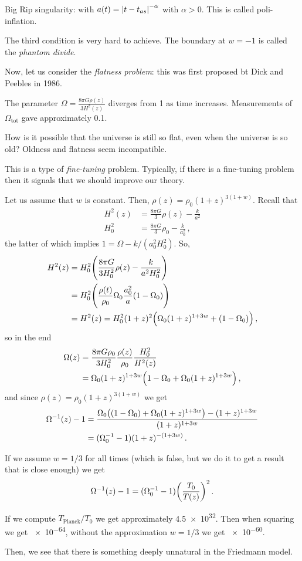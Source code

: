 \documentclass[main.tex]{subfiles}
\begin{document}
Big Rip singularity: with \(a(t) = \abs{t - t_{as}}^{- \alpha } \) with \(\alpha >0\). This is called poli-inflation.


The third condition is very hard to achieve.
The boundary at \(w = -1\) is called the \emph{phantom divide}.

Now, let us consider the \emph{flatness problem}:
this was first proposed bt Dick and Peebles in 1986.

The parameter \(\Omega = \frac{8 \pi G \rho(z) }{3 H^2(z)} \) diverges from 1 as time increases.
Measurements of \(\Omega _{\text{tot}}\) gave approximately 0.1.

How is it possible that the universe is still so flat, even when the universe is so old? Oldness and flatness seem incompatible.

This is a type of \emph{fine-tuning} problem. Typically, if there is a fine-tuning problem then it signals that we should improve our theory.

Let us assume that \(w\) is constant. Then, \(\rho (z) = \rho_{0} (1+z)^{3(1+w)}\). Recall that 
%
\begin{align}
  H^2(z) &= \frac{8 \pi G }{3} \rho (z) - \frac{k}{a^2}  \\
  H_0^2 &= \frac{8 \pi G}{3}\rho_0 - \frac{k}{a_0^2}
\,,
\end{align}
%
the latter of which implies \(1 = \Omega - k / (a_0^2 H_0^2)\). So, 
%
\begin{align}
  H^2(z) &= H_0^2 \qty(\frac{8 \pi G }{3 H_0^2} \rho (z) - \frac{k}{a^2 H_0^2}) \\
  &= H_0^2 \qty(\frac{\rho (t)}{\rho_0 }\Omega_0 \frac{a_0^2}{a} (1-\Omega_0 ))  \\
  &= H^2(z) = H_0^2 (1+z)^2 \qty(\Omega_0 (1+z)^{1+3w} + (1-\Omega_0 ))
\,,
\end{align}
%
so in the end 
%
\begin{align}
  \Omega (z) &= \frac{8 \pi G \rho_0 }{3 H_0^2 } \frac{\rho (z)}{\rho_0 } \frac{H_0^2}{H^2(z)} \\
  &=\Omega_0 (1+z)^{1+3w} \qty(1-\Omega_0 + \Omega_0 (1+z)^{1+3w}) 
\,,
\end{align}
%
and since \(\rho (z) = \rho_0 (1+z)^{3(1+w)}\) we get 
%
\begin{align}
  \Omega^{-1} (z) -1 &= \frac{\Omega_0 \qty((1-\Omega_0 ) + \Omega_0 (1+z)^{1+3w}) - (1+z)^{1+3w} }{(1+z)^{1+3w}}  \\
  &= (\Omega_0^{-1} -1) (1+z)^{-(1+3w)}
\,.
\end{align}

If we assume \(w = 1/3\) for all times (which is false, but we do it to get a result that is close enough) we get 
%
\begin{align}
  \Omega ^{-1} (z) -1= (\Omega_0 ^{-1} -1) \qty(\frac{T_0 }{T(z)})^{2}
\,.
\end{align}

If we compute \(T _{\text{Planck}} / T_0 \) we get approximately \num{4.5e32}. Then when squaring we get \num{e-64}, without the approximation \(w=1/3\) we get \num{e-60}.

Then, we see that there is something deeply unnatural in the Friedmann model.
\end{document}
